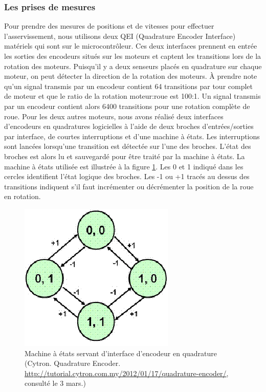 \subsubsection{Les prises de mesures}
\label{asservissement_mesures}
Pour prendre des mesures de positions et de vitesses pour effectuer l'asservissement, nous utilisons deux QEI (Quadrature Encoder Interface) matériels qui sont sur le microcontrôleur. Ces deux interfaces prennent en entrée les sorties des encodeurs situés sur les moteurs et captent les transitions lors de la rotation des moteurs. Puisqu'il y a deux senseurs placés en quadrature sur chaque moteur, on peut détecter la direction de la rotation des moteurs. À prendre note qu'un signal transmis par un encodeur contient 64 transitions par tour complet de moteur et que le ratio de la rotation moteur:roue est 100:1. Un signal transmis par un encodeur contient alors 6400 transitions pour une rotation complète de roue. Pour les deux autres moteurs, nous avons réalisé deux interfaces d'encodeurs en quadratures logicielles à l'aide de deux broches d'entrées/sorties par interface, de courtes interruptions et d'une machine à états. Les interruptions sont lancées lorsqu'une transition est détectée sur l'une des broches. L'état des broches est alors lu et sauvegardé pour être traité par la machine à états. La machine à états utilisée est illustrée à la figure \ref{fig:cytron_machine_etats}. Les 0 et 1 indiqué dans les cercles identifient l'état logique des broches. Les -1 ou +1 tracés au dessus des transitions indiquent s'il faut incrémenter ou décrémenter la position de la roue en rotation.
\begin{figure}[htbp]
\centering
\includegraphics[scale=0.7]{fig/cytron_machine_etats.png}
\caption{Machine à états servant d'interface d'encodeur en quadrature (Cytron. Quadrature Encoder. \url{http://tutorial.cytron.com.my/2012/01/17/quadrature-encoder/}, consulté le 3 mars.)}
\label{fig:cytron_machine_etats}
\end{figure}
